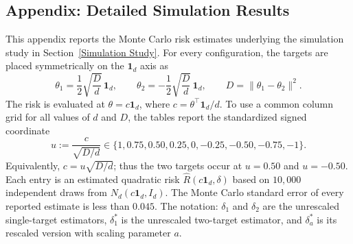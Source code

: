 \documentclass[11pt]{article}
\theoremstyle{definition}
\begin{document}
\begin{appendix}
\section*{Appendix: Detailed Simulation Results}
\label{appn}

This appendix reports the Monte Carlo risk estimates underlying the
simulation study in Section~\ref{Simulation Study}.  For every configuration,
the targets are placed symmetrically on the $\mathbf 1_d$ axis as
\[
\theta_1=\frac{1}{2}\sqrt{\frac{D}{d}}\,\mathbf 1_d,
\qquad
\theta_2=-\frac{1}{2}\sqrt{\frac{D}{d}}\,\mathbf 1_d,
\qquad
D=\lVert\theta_1-\theta_2\rVert^2.
\]
The risk is evaluated at $\theta=c\mathbf 1_d$, where
$c=\theta^\top\mathbf 1_d/d$.  To use a common column grid for all values of
$d$ and $D$, the tables report the standardized signed coordinate
\[
u:=\frac{c}{\sqrt{D/d}}
\in\{1,0.75,0.50,0.25,0,-0.25,-0.50,-0.75,-1\}.
\]
Equivalently, $c=u\sqrt{D/d}$; thus the two targets occur at
$u=0.50$ and $u=-0.50$.  Each entry is an estimated quadratic risk
$\widehat R(c\mathbf 1_d,\delta)$ based on $10{,}000$ independent draws from
$N_d(c\mathbf 1_d,I_d)$.  The Monte Carlo standard error of every reported
estimate is less than $0.045$.  The notation:
$\delta_1$ and $\delta_2$ are the unrescaled single-target estimators,
$\delta_1^*$ is the unrescaled two-target estimator, and $\delta_a^*$ is its
rescaled version with scaling parameter $a$.


\end{appendix}
\end{document}
